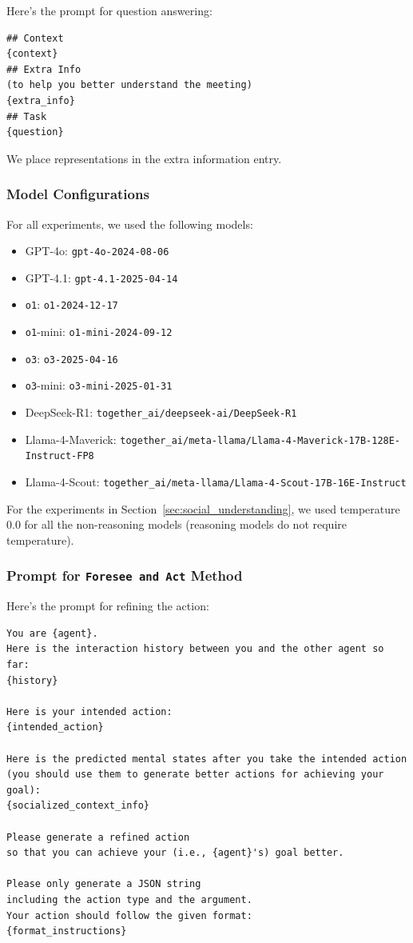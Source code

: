 Here's the prompt for question answering:

\begin{lstlisting}
## Context
{context}
## Extra Info
(to help you better understand the meeting)
{extra_info}
## Task
{question}
\end{lstlisting}

We place \protocolname representations in the extra information entry.

\subsubsection{Model Configurations}
For all experiments, we used the following models:
\begin{itemize}
    \item GPT-4o: \texttt{gpt-4o-2024-08-06}
    \item GPT-4.1: \texttt{gpt-4.1-2025-04-14}
    \item \texttt{o1}: \texttt{o1-2024-12-17}
    \item \texttt{o1}-mini: \texttt{o1-mini-2024-09-12}
    \item \texttt{o3}: \texttt{o3-2025-04-16}
    \item \texttt{o3}-mini: \texttt{o3-mini-2025-01-31}
    \item DeepSeek-R1: \texttt{together\_ai/deepseek-ai/DeepSeek-R1}
    \item Llama-4-Maverick: \texttt{together\_ai/meta-llama/Llama-4-Maverick-17B-128E-Instruct-FP8}
    \item Llama-4-Scout: \texttt{together\_ai/meta-llama/Llama-4-Scout-17B-16E-Instruct}
\end{itemize}

For the experiments in Section~\ref{sec:social_understanding}, we used temperature $0.0$ for all the non-reasoning models (reasoning models do not require temperature).

\subsubsection{Prompt for \texttt{Foresee and Act} Method}
\label{app:forsee_and_act}
Here's the prompt for refining the action:

\begin{lstlisting}
You are {agent}.
Here is the interaction history between you and the other agent so far:
{history}

Here is your intended action:
{intended_action}

Here is the predicted mental states after you take the intended action 
(you should use them to generate better actions for achieving your goal):
{socialized_context_info}

Please generate a refined action 
so that you can achieve your (i.e., {agent}'s) goal better.

Please only generate a JSON string 
including the action type and the argument.
Your action should follow the given format:
{format_instructions}
\end{lstlisting}

